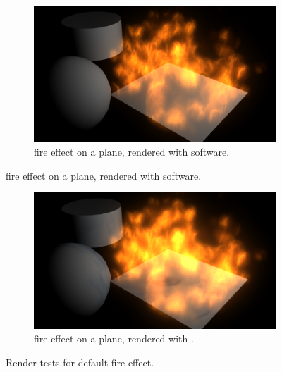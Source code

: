 \begin{figure}[htpb]
		\ContinuedFloat
		\begin{subfigure}[t]{\textwidth}
                \includegraphics[width=\textwidth]{img/maya_fire}
                \caption{\Maya fire effect on a plane, rendered with \Maya software.}
                \label{fig:maya_fire}
        \end{subfigure}%
\end{figure}

\begin{figure}[htpb]
        \ContinuedFloat
 		\begin{subfigure}[t]{\textwidth}
                \includegraphics[width=\textwidth]{img/maya_fire_mental_ray}
                \caption{\Maya fire effect on a plane, rendered with \MentalRay.}
                \label{fig:maya_fire_mental_ray}
        \end{subfigure}%
        \caption{Render tests for \Maya default fire effect.}
        \label{fig:maya_fire_scenes}
\end{figure}

